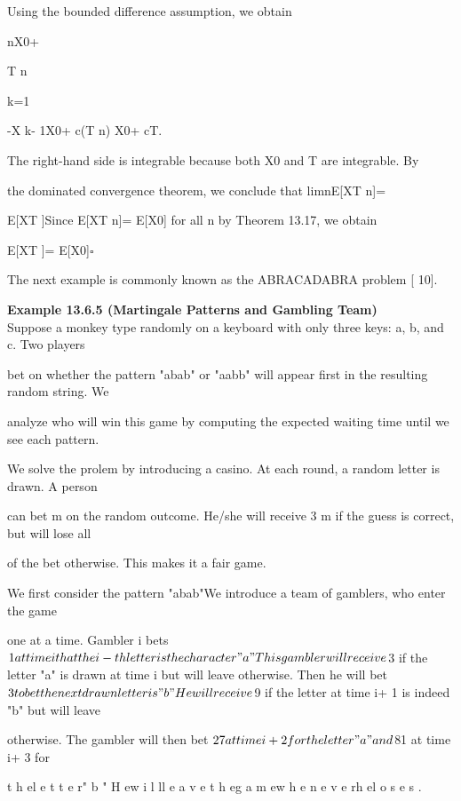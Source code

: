 {Using the bounded difference assumption, we obtain

\vertXT n\vert\leq\vert X0\vert+

T n\sum

k=1

\vertXk -X k- 1\vert\leq\vert X0\vert+ c\cdot (T n) \leq\vert X0\vert+ cT.

The right-hand side is integrable because both X0 and T are integrable. By

the dominated convergence theorem, we conclude that limn\to\infty E[XT n]=

E[XT ]Since E[XT n]= E[X0] for all n by Theorem 13.17, we obtain

E[XT ]= E[X0]\hfill $\square$

The next example is commonly known as the ABRACADABRA problem [ 10].

\textbf{Example 13.6.5 (Martingale Patterns and Gambling Team)} \\

Suppose a monkey type randomly on a keyboard with only three keys: a, b, and c. Two players

bet on whether the pattern "abab" or "aabb" will appear first in the resulting random string. We

analyze who will win this game by computing the expected waiting time until we see each pattern.

We solve the prolem by introducing a casino. At each round, a random letter is drawn. A person

can bet m on the random outcome. He/she will receive 3 m if the guess is correct, but will lose all

of the bet otherwise. This makes it a fair game.

We first consider the pattern "abab"We introduce a team of gamblers, who enter the game

one at a time. Gambler i bets $1 at time i that the i -th letter is the character "a"This gambler will

receive $3 if the letter "a" is drawn at time i but will leave otherwise. Then he will bet $3 to bet

the next drawn letter is "b"He will receive $9 if the letter at time i+ 1 is indeed "b" but will leave

otherwise. The gambler will then bet $27 at time i+ 2 for the letter "a" and $81 at time i+ 3 for

t h el e t t e r" b " H ew i l ll e a v e t h eg a m ew h e n e v e rh el o s e s .

}
